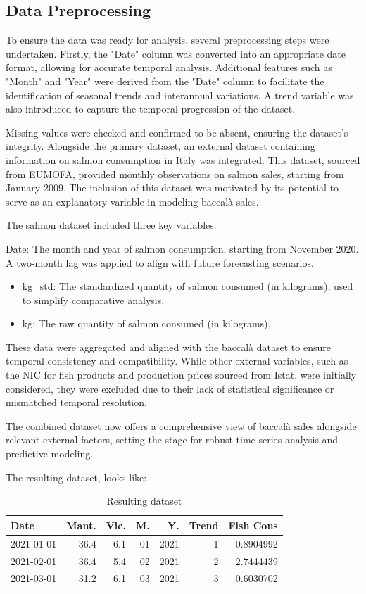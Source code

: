 \documentclass[10pt,twocolumn,letterpaper]{article}
\begin{document}
\subsection{Data Preprocessing}
To ensure the data was ready for analysis, several preprocessing steps were undertaken. Firstly, the "Date" column was converted into an appropriate date format, allowing for accurate temporal analysis. Additional features such as "Month" and "Year" were derived from the "Date" column to facilitate the identification of seasonal trends and interannual variations. A trend variable was also introduced to capture the temporal progression of the dataset.

Missing values were checked and confirmed to be absent, ensuring the dataset's integrity. Alongside the primary dataset, an external dataset containing information on salmon consumption in Italy was integrated. This dataset, sourced from \href{https://eumofa.eu/first-sale-weekly-data}{EUMOFA}, provided monthly observations on salmon sales, starting from January 2009. The inclusion of this dataset was motivated by its potential to serve as an explanatory variable in modeling baccalà sales.

The salmon dataset included three key variables:

Date: The month and year of salmon consumption, starting from November 2020. A two-month lag was applied to align with future forecasting scenarios.
\begin{itemize}
    \item kg\_std: The standardized quantity of salmon consumed (in kilograms), used to simplify comparative analysis.
    \item kg: The raw quantity of salmon consumed (in kilograms).
\end{itemize}

These data were aggregated and aligned with the baccalà dataset to ensure temporal consistency and compatibility. While other external variables, such as the NIC for fish products and production prices sourced from Istat, were initially considered, they were excluded due to their lack of statistical significance or mismatched temporal resolution.

The combined dataset now offers a comprehensive view of baccalà sales alongside relevant external factors, setting the stage for robust time series analysis and predictive modeling.

The resulting dataset, looks like:
\begin{table}[H]
\centering
\small
\begin{tabular}{|l|r|r|r|r|r|r|}
\hline
\textbf{Date} & \textbf{Mant.} & \textbf{Vic.} & \textbf{M.} & \textbf{Y.} & \textbf{Trend} & \textbf{Fish Cons} \\
\hline
2021-01-01 & 36.4 & 6.1 & 01 & 2021 & 1 & 0.8904992 \\
2021-02-01 & 36.4 & 5.4 & 02 & 2021 & 2 & 2.7444439 \\
2021-03-01 & 31.2 & 6.1 & 03 & 2021 & 3 & 0.6030702 \\
\hline
\end{tabular}
\caption{Resulting dataset}
\label{table:resulting_dataset}
\end{table}
\end{document}
